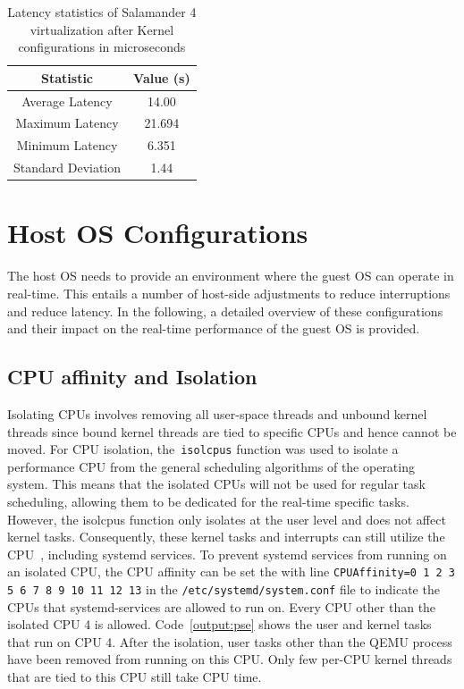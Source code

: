 \documentclass[MMR,Master,english]{twbook}
\begin{document}
\begin{table}[H]
	\centering
	\caption[Latency statistics of Salamander 4 after Kernel configurations]{Latency statistics of Salamander 4 virtualization after Kernel configurations in microseconds}
	\label{tab:latency_statistics_kernel}
	\setlength{\tabcolsep}{0.5em} %
	{\renewcommand{\arraystretch}{1.2}%
		\begin{tabular}{|c|c|}\hline
			\textbf{Statistic} & \textbf{Value (\textmu s)} \\\hline
			Average Latency    & 14.00                      \\\hline
			Maximum Latency    & 21.694                     \\\hline
			Minimum Latency    & 6.351                      \\\hline
			Standard Deviation & 1.44                       \\\hline
		\end{tabular}}
\end{table}



\section{Host OS Configurations}\label{sec:host_configurations}
The host OS needs to provide an environment where the guest OS can operate in real-time. This entails a number of host-side adjustments to reduce interruptions and reduce latency. In the following, a detailed overview of these configurations and their impact on the real-time performance of the guest OS is provided.
\subsection{CPU affinity and Isolation}\label{subsec:cpu_isolation}

Isolating CPUs involves removing all user-space threads and unbound kernel threads since bound kernel threads are tied to specific CPUs and hence cannot be moved. For CPU isolation, the~\texttt{isolcpus} function was used to isolate a performance CPU from the general scheduling algorithms of the operating system. This means that the isolated CPUs will not be used for regular task scheduling, allowing them to be dedicated for the real-time specific tasks. However, the isolcpus function only isolates at the user level and does not affect kernel tasks. Consequently, these kernel tasks and interrupts can still utilize the CPU~\cite{maPerformanceTuningKVMbased}, including systemd services. To prevent systemd services from running on an isolated CPU, the CPU affinity can be set the with line \texttt{CPUAffinity=0 1 2 3 5 6 7 8 9 10 11 12 13} in the \texttt{/etc/systemd/system.conf} file to indicate the CPUs that systemd-services are allowed to run on. Every CPU other than the isolated CPU 4 is allowed. Code~\ref{output:pse} shows the user and kernel tasks that run on CPU 4. After the isolation, user tasks other than the QEMU process have been removed from running on this CPU. Only few per-CPU kernel threads that are tied to this CPU still take CPU time.
\end{document}

